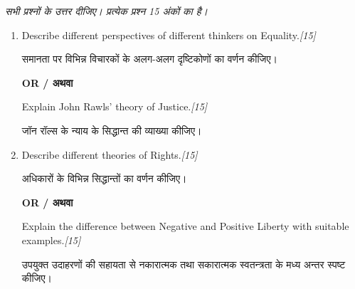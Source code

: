 \documentclass[11pt,a4paper]{article}
\newcommand{\pts}[1]{\hfill \textit{[#1]}}
\begin{document}
\noindent \textit{सभी प्रश्नों के उत्तर दीजिए। प्रत्येक प्रश्न 15 अंकों का है।}

\begin{enumerate}[label=\textbf{\arabic*.},leftmargin=*,start=5,itemsep=14pt]

  \item Describe different perspectives of different thinkers on Equality.\pts{15}
  
  समानता पर विभिन्न विचारकों के अलग-अलग दृष्टिकोणों का वर्णन कीजिए।

  \begin{center}\textbf{OR / अथवा}\end{center}

  Explain John Rawls' theory of Justice.\pts{15}
  
  जॉन रॉल्स के न्याय के सिद्धान्त की व्याख्या कीजिए।

  \item Describe different theories of Rights.\pts{15}
  
  अधिकारों के विभिन्न सिद्धान्तों का वर्णन कीजिए।

  \begin{center}\textbf{OR / अथवा}\end{center}

  Explain the difference between Negative and Positive Liberty with suitable examples.\pts{15}
  
  उपयुक्त उदाहरणों की सहायता से नकारात्मक तथा सकारात्मक स्वतन्त्रता के मध्य अन्तर स्पष्ट कीजिए।

\end{enumerate}
\end{document}
